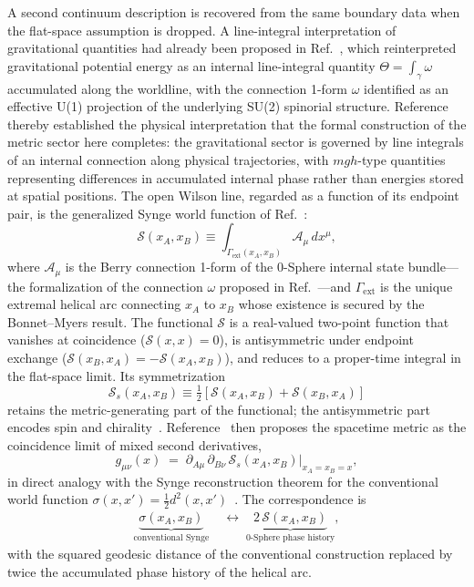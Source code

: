 \documentclass[%
 reprint, amsmath,amssymb, aps, prb, ]{revtex4-2}
\numberwithin{equation}{section}
\begin{document}
A second continuum description is recovered from the same boundary data when the flat-space assumption is dropped. A line-integral interpretation of gravitational quantities had already been proposed in Ref.~\cite{hanamura37}, which reinterpreted gravitational potential energy as an internal line-integral quantity $\Theta = \int_\gamma \omega$ accumulated along the worldline, with the connection 1-form $\omega$ identified as an effective U(1) projection of the underlying SU(2) spinorial structure. Reference~\cite{hanamura37} thereby established the physical interpretation that the formal construction of the metric sector here completes: the gravitational sector is governed by line integrals of an internal connection along physical trajectories, with $mgh$-type quantities representing differences in accumulated internal phase rather than energies stored at spatial positions. The open Wilson line, regarded as a function of its endpoint pair, is the generalized Synge world function of Ref.~\cite{hanamura51}:
\begin{equation}
\mathcal{S}(x_A, x_B) \equiv \int_{\Gamma_{\text{ext}}(x_A, x_B)} \mathcal{A}_\mu\, dx^\mu,
\label{eq:synge_def}
\end{equation}
where $\mathcal{A}_\mu$ is the Berry connection 1-form of the 0-Sphere internal state bundle---the formalization of the connection $\omega$ proposed in Ref.~\cite{hanamura37}---and $\Gamma_{\text{ext}}$ is the unique extremal helical arc connecting $x_A$ to $x_B$ whose existence is secured by the Bonnet--Myers result. The functional $\mathcal{S}$ is a real-valued two-point function that vanishes at coincidence ($\mathcal{S}(x,x) = 0$), is antisymmetric under endpoint exchange ($\mathcal{S}(x_B,x_A) = -\mathcal{S}(x_A,x_B)$), and reduces to a proper-time integral in the flat-space limit. Its symmetrization
\begin{equation}
\mathcal{S}_s(x_A, x_B) \equiv \tfrac{1}{2}\!\left[\mathcal{S}(x_A,x_B) + \mathcal{S}(x_B,x_A)\right]
\label{eq:symmetrization}
\end{equation}
retains the metric-generating part of the functional; the antisymmetric part encodes spin and chirality~\cite{hanamura50}. Reference~\cite{hanamura51} then proposes the spacetime metric as the coincidence limit of mixed second derivatives,
\begin{equation}
g_{\mu\nu}(x) \;=\; \partial_{A\mu}\,\partial_{B\nu}\,\mathcal{S}_s(x_A,x_B)\Big|_{x_A = x_B = x},
\label{eq:metric_proposal}
\end{equation}
in direct analogy with the Synge reconstruction theorem for the conventional world function $\sigma(x,x') = \tfrac{1}{2}d^2(x,x')$~\cite{Synge1960, DeWittBrehme1960}. The correspondence is
\begin{align}
\underbrace{\sigma(x_A, x_B)}_{\text{conventional Synge}}
&\;\longleftrightarrow\;
\underbrace{2\,\mathcal{S}(x_A, x_B)}_{\text{0-Sphere phase history}},
\label{eq:synge_correspondence}
\end{align}
with the squared geodesic distance of the conventional construction replaced by twice the accumulated phase history of the helical arc.
\end{document}
